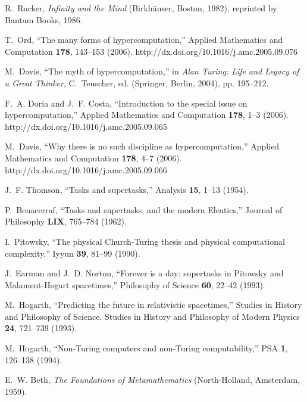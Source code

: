 \documentclass[pre,amssymb,showpacs,showkeys,preprint]{revtex4}
\begin{document}
\begin{thebibliography}{10}
R.~Rucker, {\em Infinity and the Mind\/} (Birkh{\"{a}}user, Boston, 1982),
  reprinted by Bantam Books, 1986.

T.~Ord, \enquote{The many forms of hypercomputation,} Applied Mathematics and
  Computation {\bf 178}, 143--153 (2006).
\newline http://dx.doi.org/10.1016/j.amc.2005.09.076

M.~Davis, \enquote{The myth of hypercomputation,} in {\em Alan Turing: Life and
  Legacy of a Great Thinker\/}, C.~Teuscher, ed.  (Springer, Berlin, 2004), pp.
  195--212.

F.~A. Doria and J.~F. Costa, \enquote{Introduction to the special issue on
  hypercomputation,} Applied Mathematics and Computation {\bf 178}, 1--3
  (2006).
\newline http://dx.doi.org/10.1016/j.amc.2005.09.065

M.~Davis, \enquote{Why there is no such discipline as hypercomputation,}
  Applied Mathematics and Computation {\bf 178}, 4--7 (2006).
\newline http://dx.doi.org/10.1016/j.amc.2005.09.066

J.~F. Thomson, \enquote{Tasks and supertasks,} Analysis {\bf 15}, 1--13 (1954).

P.~Benacerraf, \enquote{Tasks and supertasks, and the modern {E}leatics,}
  Journal of Philosophy {\bf LIX}, 765--784 (1962).

I.~Pitowsky, \enquote{The physical {C}hurch-{T}uring thesis and physical
  computational complexity,} Iyyun {\bf 39}, 81--99 (1990).

J.~Earman and J.~D. Norton, \enquote{Forever is a day: supertasks in {P}itowsky
  and {M}alament-{H}ogart spacetimes,} Philosophy of Science {\bf 60}, 22--42
  (1993).

M.~Hogarth, \enquote{Predicting the future in relativistic spacetimes,} Studies
  in History and Philosophy of Science. Studies in History and Philosophy of
  Modern Physics {\bf 24}, 721--739 (1993).

M.~Hogarth, \enquote{Non-{T}uring computers and non-{T}uring computability,}
  PSA {\bf 1}, 126--138 (1994).

E.~W. Beth, {\em The Foundations of Metamathematics\/} (North-Holland,
  Amsterdam, 1959).


\end{thebibliography}
\end{document}
